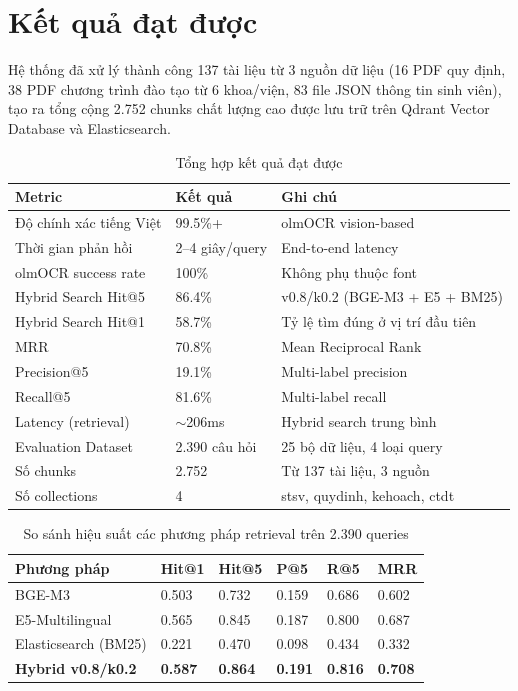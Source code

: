 \documentclass[../DoAn.tex]{subfiles}
\begin{document}
\section{Kết quả đạt được}

Hệ thống đã xử lý thành công 137 tài liệu từ 3 nguồn dữ liệu (16 PDF quy định, 38 PDF chương trình đào tạo từ 6 khoa/viện, 83 file JSON thông tin sinh viên), tạo ra tổng cộng 2.752 chunks chất lượng cao được lưu trữ trên Qdrant Vector Database và Elasticsearch.

\begin{table}[h]
\centering
\begin{tabular}{|l|l|l|}
\hline
\textbf{Metric} & \textbf{Kết quả} & \textbf{Ghi chú} \\
\hline
Độ chính xác tiếng Việt & 99.5\%+ & olmOCR vision-based \\
\hline
Thời gian phản hồi & 2--4 giây/query & End-to-end latency \\
\hline
olmOCR success rate & 100\% & Không phụ thuộc font \\
\hline
Hybrid Search Hit@5 & 86.4\% & v0.8/k0.2 (BGE-M3 + E5 + BM25) \\
\hline
Hybrid Search Hit@1 & 58.7\% & Tỷ lệ tìm đúng ở vị trí đầu tiên \\
\hline
MRR & 70.8\% & Mean Reciprocal Rank \\
\hline
Precision@5 & 19.1\% & Multi-label precision \\
\hline
Recall@5 & 81.6\% & Multi-label recall \\
\hline
Latency (retrieval) & $\sim$206ms & Hybrid search trung bình \\
\hline
Evaluation Dataset & 2.390 câu hỏi & 25 bộ dữ liệu, 4 loại query \\
\hline
Số chunks & 2.752 & Từ 137 tài liệu, 3 nguồn \\
\hline
Số collections & 4 & stsv, quydinh, kehoach, ctdt \\
\hline
\end{tabular}
\caption{Tổng hợp kết quả đạt được}
\end{table}

\begin{table}[h]
\centering
\begin{tabular}{|l|l|l|l|l|l|}
\hline
\textbf{Phương pháp} & \textbf{Hit@1} & \textbf{Hit@5} & \textbf{P@5} & \textbf{R@5} & \textbf{MRR} \\
\hline
BGE-M3 & 0.503 & 0.732 & 0.159 & 0.686 & 0.602 \\
\hline
E5-Multilingual & 0.565 & 0.845 & 0.187 & 0.800 & 0.687 \\
\hline
Elasticsearch (BM25) & 0.221 & 0.470 & 0.098 & 0.434 & 0.332 \\
\hline
\textbf{Hybrid v0.8/k0.2} & \textbf{0.587} & \textbf{0.864} & \textbf{0.191} & \textbf{0.816} & \textbf{0.708} \\
\hline
\end{tabular}
\caption{So sánh hiệu suất các phương pháp retrieval trên 2.390 queries}
\end{table}
\end{document}
